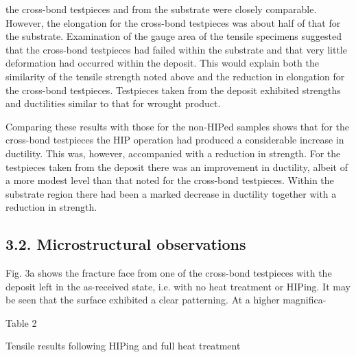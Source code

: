 \documentclass[10pt]{article}
\begin{document}
the cross-bond testpieces and from the substrate were closely comparable. However, the elongation for the cross-bond testpieces was about half of that for the substrate. Examination of the gauge area of the tensile specimens suggested that the cross-bond testpieces had failed within the substrate and that very little deformation had occurred within the deposit. This would explain both the similarity of the tensile strength noted above and the reduction in elongation for the cross-bond testpieces. Testpieces taken from the deposit exhibited strengths and ductilities similar to that for wrought product.

Comparing these results with those for the non-HIPed samples shows that for the cross-bond testpieces the HIP operation had produced a considerable increase in ductility. This was, however, accompanied with a reduction in strength. For the testpieces taken from the deposit there was an improvement in ductility, albeit of a more modest level than that noted for the cross-bond testpieces. Within the substrate region there had been a marked decrease in ductility together with a reduction in strength.

\subsection*{3.2. Microstructural observations}
Fig. 3a shows the fracture face from one of the cross-bond testpieces with the deposit left in the as-received state, i.e. with no heat treatment or HIPing. It may be seen that the surface exhibited a clear patterning. At a higher magnifica-

Table 2

Tensile results following HIPing and full heat treatment
\end{document}
